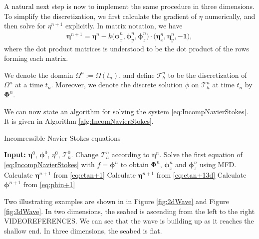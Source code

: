 \documentclass[12pt]{article}
\begin{document}
A natural next step is now to implement the same procedure in three dimensions. To simplify the discretization, we first calculate
the gradient of $\eta$ numerically, and then solve for $\eta^{n+1}$ explicitly. In matrix notation, we have
\begin{align}
    \label{eq:etan+13d}
    \bm{\eta}^{n+1} = \bm{\eta}^n - k \big(\bm{\phi}_x^n, \bm{\phi}_y^n, \bm{\phi}_z^n\big)\cdot(\bm{\eta}_x^n, \bm{\eta}_y^n, -\bm{1}\big),
\end{align}
where the dot product matrices is understood to be the dot product of the rows forming each matrix.

We denote the domain $\Omega^n := \Omega(t_n)$, and define $\mathcal{T}_h^n$ to be the discretization of $\Omega^n$
at a time $t_n$. Moreover, we denote the discrete solution $\phi$ on $\mathcal{T}_h^n$ at time $t_n$ by $\bm{\Phi}^n$.

We can now state an algorithm for solving the system \eqref{eq:IncompNavierStokes}. It is given in Algorithm \ref{alg:IncomNavierStokes}.
%
%
\begin{algorithm}
    \caption{Incomressible Navier Stokes equations}
    \begin{algorithmic}[1]
    \State    \textbf{Input:} $\bm{\eta}^0$, $\bm{\phi}^0$, $\eta^0$, $\mathcal{T}_h^0$.
	    \State    Change $\mathcal{T}_h^n$ according to $\bm{\eta}^n$.
            \State    Solve the first equation of \eqref{eq:IncompNavierStokes} with $f = \bm{\phi}^n$ to obtain
                      $\bm{\Phi}^{n}$, $\bm{\phi}_x^n$ and $\bm{\phi}_z^n$ using MFD.
                \State    Calculate $\bm{\eta}^{n+1}$ from \eqref{eq:etan+1}
			    \State    Calculate $\bm{\eta}^{n+1}$ from \eqref{eq:etan+13d}
			\EndIf
        \State    Calculate $\bm{\phi}^{n+1}$ from \eqref{eq:phin+1}
        \EndFor
	\end{algorithmic}
	\label{alg:IncomNavierStokes}
\end{algorithm}

Two illustrating examples are shown in in Figure \ref{fig:2dWave} and Figure \ref{fig:3dWave}. In two dimensions, the seabed is ascending
from the left to the right VIDEOREFERENCES. We can see that the wave is building up as it reaches the shallow end. In three dimensions,
the seabed is flat.
\end{document}

